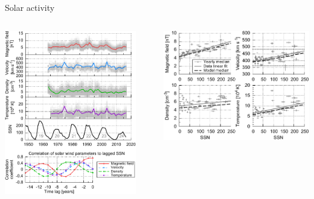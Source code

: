 \begin{frame}[plain,c]{Solar activity}{}
	\begin{columns}[c]
		
		\includegraphics[width=0.9\textwidth]{../figures_paper/OMNI_yearly_ssn_correlation_c_plot.pdf}

		
		\includegraphics[width=\textwidth]{../figures_paper/OMNI_yearly_BVNTvsSSN_a.pdf}
		
	\end{columns}
\end{frame}
